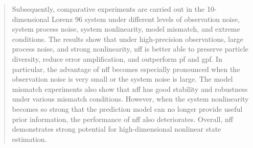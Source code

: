\documentclass[english]{isasthesis}
\begin{document}
\begin{abstract}
		Subsequently, comparative experiments are carried out in the 10-dimensional Lorenz 96 system under different levels of observation noise, system process noise, system nonlinearity, model mismatch, and extreme conditions. The results show that under high-precision observations, large process noise, and strong nonlinearity, \ac{nff} is better able to preserve particle diversity, reduce error amplification, and outperform \ac{pf} and \ac{gpf}. In particular, the advantage of \ac{nff} becomes especially pronounced when the observation noise is very small or the system noise is large. The model mismatch experiments also show that \ac{nff} has good stability and robustness under various mismatch conditions. However, when the system nonlinearity becomes so strong that the prediction model can no longer provide useful prior information, the performance of \ac{nff} also deteriorates. Overall, \ac{nff} demonstrates strong potential for high-dimensional nonlinear state estimation.
	\end{abstract}
	
	\maketoc

	
	
	
	
	
	
	\appendix
	

	
\end{document}
